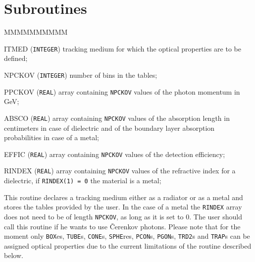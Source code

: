 \section{Subroutines}


\begin{DLtt}{MMMMMMMMMM}
\item[ITMED] ({\tt INTEGER}) tracking medium for which the optical
properties are to be defined;
\item[NPCKOV] ({\tt INTEGER}) number of bins in the tables;
\item[PPCKOV] ({\tt REAL}) array containing {\tt NPCKOV} values
of the photon momentum in GeV;
\item[ABSCO] ({\tt REAL}) array containing {\tt NPCKOV} values
of the absorption length in centimeters in case of dielectric and of the
boundary layer absorption probabilities in case of a metal;
\item[EFFIC] ({\tt REAL}) array containing {\tt NPCKOV} values of the
detection efficiency;
\item[RINDEX] ({\tt REAL}) array containing {\tt NPCKOV} values of the
refractive index for a dielectric, if {\tt RINDEX(1) = 0} the material
is a metal;
\end{DLtt}

This routine declares a tracking medium either as a radiator or as a
metal and stores the tables provided by the user. In the case of a 
metal the {\tt RINDEX} array does not need to be of length {\tt NPCKOV},
as long as it is set
to 0. The user should call this routine if he wants to use \v{C}erenkov
photons. Please note that for the moment only 
{\tt BOX}es, {\tt TUBE}s, {\tt CONE}s, {\tt SPHE}res, {\tt PCON}s,
{\tt PGON}s, {\tt TRD2}s and {\tt TRAP}s can be assigned optical properties
due to the current limitations of the  routine described
below.


